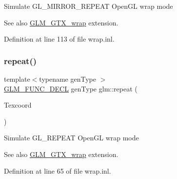 Simulate G\+L\+\_\+\+M\+I\+R\+R\+O\+R\+\_\+\+R\+E\+P\+E\+AT Open\+GL wrap mode \begin{DoxySeeAlso}{See also}
\hyperlink{group__gtx__wrap}{G\+L\+M\+\_\+\+G\+T\+X\+\_\+wrap} extension. 
\end{DoxySeeAlso}


Definition at line 113 of file wrap.\+inl.

\mbox{\label{group__gtx__wrap_ga809650c6310ea7c42666e918c117fb6f}} 
\subsubsection{\texorpdfstring{repeat()}{repeat()}}
{\footnotesize\ttfamily template$<$typename gen\+Type $>$ \\
\hyperlink{setup_8hpp_ab2d052de21a70539923e9bcbf6e83a51}{G\+L\+M\+\_\+\+F\+U\+N\+C\+\_\+\+D\+E\+CL} gen\+Type glm\+::repeat (\begin{DoxyParamCaption}\item[{gen\+Type const \&}]{Texcoord }\end{DoxyParamCaption})}

Simulate G\+L\+\_\+\+R\+E\+P\+E\+AT Open\+GL wrap mode \begin{DoxySeeAlso}{See also}
\hyperlink{group__gtx__wrap}{G\+L\+M\+\_\+\+G\+T\+X\+\_\+wrap} extension. 
\end{DoxySeeAlso}


Definition at line 65 of file wrap.\+inl.

